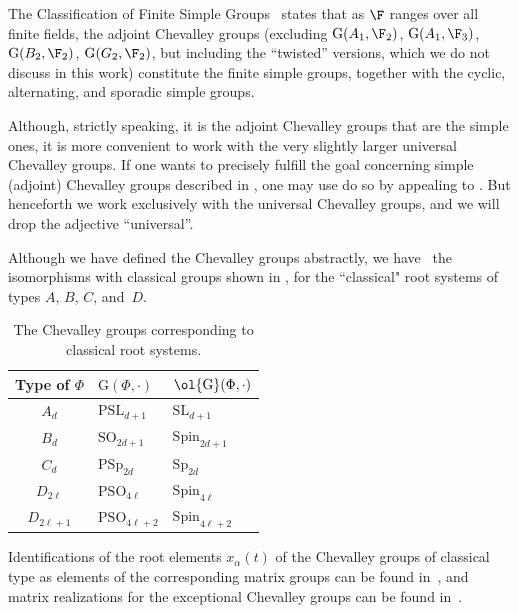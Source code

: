 \documentclass[11pt]{article}
\newcommand{\Esc}[2]{\ol{\mathrm{G}}(#1,#2)}
\newcommand{\G}[2]{\mathrm{G}(#1,#2)}
\begin{document}
\begin{remark}  \label{rem:CFSG}
   The Classification of Finite Simple Groups~\cite{Asc04} states that as $\F$ ranges over all finite fields, the adjoint Chevalley groups (excluding $\G{A_1}{\F_2}$, $\G{A_1}{\F_3}$, $\G{B_2}{\F_2}$, $\G{G_2}{\F_2}$, but including the ``twisted'' versions, which we do not discuss in this work) constitute the finite simple groups, together with the cyclic, alternating, and sporadic simple groups.
\end{remark}
Although, strictly speaking, it is the adjoint Chevalley groups that are the simple ones, it is more convenient to work with the very slightly larger universal Chevalley groups.
If one wants to precisely fulfill the goal concerning simple (adjoint) Chevalley groups described in , one may use do so by appealing to .
But henceforth we work exclusively with the universal Chevalley groups, and we will drop the adjective ``universal''.

Although we have defined the Chevalley groups abstractly, we have~\cite[Sec.~3.3]{Ste16} the isomorphisms with classical groups shown in , for the ``classical" root systems of types $A$, $B$, $C$, and~$D$.

\begin{table}[H]
\centering
\begin{tabular}{cll}\label{table:classical}
Type of $\Phi$     & $\G{\Phi}{\cdot}$     & $\Esc{\Phi}{\cdot}$      \\ \hline
$A_d$      & $\mathrm{PSL}_{d+1}$  & $\mathrm{SL}_{d+1}$    \\
$B_d$      & $\mathrm{SO}_{2d+1}$  & $\mathrm{Spin}_{2d+1}$ \\
$C_d$      & $\mathrm{PSp}_{2d}$   & $\mathrm{Sp}_{2d}$     \\
$D_{2\ell}$   & $\mathrm{PSO}_{4\ell}$   & $\mathrm{Spin}_{4\ell}$\\
$D_{2\ell+1}$ & $\mathrm{PSO}_{4\ell+2}$ & $\mathrm{Spin}_{4\ell+2}$
\end{tabular}
\caption{The Chevalley groups corresponding to classical root systems.}
\label{tab:iso}
\end{table}

Identifications of the root elements $x_\alpha(t)$ of the Chevalley groups of classical type as elements of the corresponding matrix groups can be found in~\cite[Sec.~11.3]{Car89}, and matrix realizations for the exceptional Chevalley groups can be found in~\cite{HRT01}.
\end{document}
